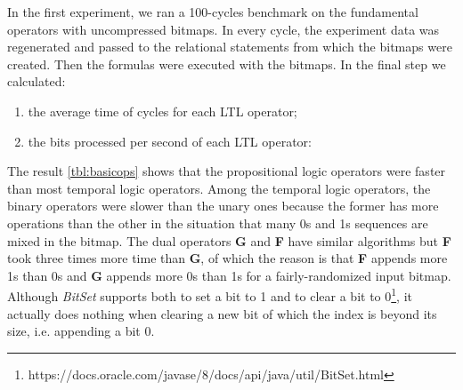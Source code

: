 In the first experiment, we ran a 100-cycles benchmark on the fundamental operators with uncompressed bitmaps. In every cycle, the experiment data was regenerated and passed to the relational statements from which the bitmaps were created. Then the formulas were executed with the bitmaps. In the final step we calculated:
\begin{enumerate}
\item the average time of cycles for each LTL operator;
\item the bits processed per second of each LTL operator: \newline
\begin{small}
 \label{eq:bps}
\end{small}
\end{enumerate}

The result \ref{tbl:basicops} shows that the propositional logic operators were faster than most temporal logic operators. Among the temporal logic operators, the binary operators were slower than the unary ones because the former has more operations than the other in the situation that many 0s and 1s sequences are mixed in the bitmap. The dual operators \textbf{G} and \textbf{F} have similar algorithms but \textbf{F} took three times more time than \textbf{G}, of which the reason is that \textbf{F} appends more 1s than 0s and \textbf{G} appends more 0s than 1s for a fairly-randomized input bitmap. Although \emph{BitSet} supports both to set a bit to 1 and to clear a bit to 0\footnote{https://docs.oracle.com/javase/8/docs/api/java/util/BitSet.html}, it actually does nothing when clearing a new bit of which the index is beyond its size, i.e. appending a bit 0.

